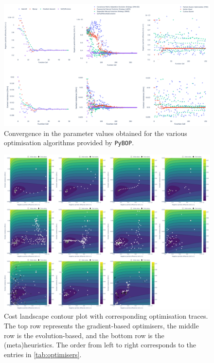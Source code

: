 \documentclass[
]{article}
\begin{document}
\begin{figure}
\centering
\includegraphics[width=1\textwidth,height=\textheight]{figures/joss/optimisers_parameters.png}
\caption{Convergence in the parameter values obtained for the various
optimisation algorithms provided by \texttt{PyBOP}.
\label{fig:optimiser-inference}}
\end{figure}

\begin{figure}
\centering
\includegraphics[width=1\textwidth,height=\textheight]{figures/joss/contour_total.png}
\caption{Cost landscape contour plot with corresponding optimisation
traces. The top row represents the gradient-based optimisers, the middle
row is the evolution-based, and the bottom row is the (meta)heuristics.
The order from left to right corresponds to the entries in
\autoref{tab:optimisers}. \label{fig:optimiser-inference}}
\end{figure}
\end{document}
